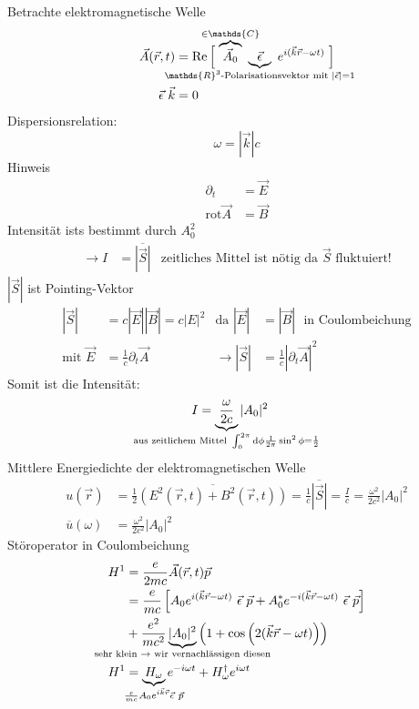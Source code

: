 	Betrachte elektromagnetische Welle
		\begin{align*}
			\vec{A}(\vec{r} , t) &= 
			\mathrm{Re} \left[ \vphantom{ \vec{A}_0 \vec{\epsilon} ~ e^{i(\vec{k} \vec{r} - \omega t)}} \right.
			\overbrace{\vec{A}_0}^{\mathclap{\in \mathds{C}}}
			~ \underbrace{\vec{\epsilon}}_{\mathclap{\mathds{R}^3 \text{-Polarisationsvektor mit~} |\vec{\epsilon}| = 1}}
			~ e^{i(\vec{k} \vec{r} - \omega t)}
			\left. \vphantom{ \vec{A}_0 \vec{\epsilon} ~ e^{i(\vec{k} \vec{r} - \omega t)}} \right] \\
			\vec{\epsilon} ~\vec{k} &= 0
		\end{align*}
	Dispersionsrelation: 
		\begin{equation*}
			\omega = |\vec{k}| c
		\end{equation*}
	Hinweis 
		\begin{align*}
			\partial_{t} &= \vec{E} \\
			\mathrm{rot} \vec{A} &= \vec{B}
		\end{align*}
	Intensität ists bestimmt durch $A_0^2$
		\begin{align*}
			\rightarrow I &= \overline{|\vec{S}|} & \text{zeitliches Mittel ist nötig da $\vec{S}$ fluktuiert!}
		\end{align*}
	$| \vec{S} |$ ist Pointing-Vektor 
		\begin{align*}
			| \vec{S} | &= c |\vec{E}| |\vec{B}| = c |E|^2 &\text{da~} |\vec{E}| &= |\vec{B}| \text{~ in Coulombeichung} \\
			\text{mit~} \vec{E} &= \frac{1}{c} \partial_t \vec{A} 
			&\rightarrow |\vec{S}| &= \frac{1}{c} \left|\partial_t \vec{A}\right|^2
		\end{align*}
	Somit ist die Intensität:
		\begin{align*}
			I &= \underbrace{\frac{\omega}{2 c}}_{\mathclap{\text{aus zeitlichem Mittel~} \int_{0}^{2 \pi} \diff \phi \frac{1}{2 \pi} \sin^2 \phi = \frac{1}{2}}}
			|A_0|^2
		\end{align*}
	Mittlere Energiedichte der elektromagnetischen Welle
		\begin{align*}
			u (\vec{r}) &=
			\frac{1}{2} \overline{\left( E^2(\vec{r} , t) + B^2(\vec{r} , t) \right)} 
			= \frac{1}{c} \overline{|\vec{S}|} = 
			\frac{I}{c} = \frac{\omega^2}{2 c^2} |A_0|^2 \\
			\overline{u} (\omega) &= \frac{\omega^2}{2 c^2} |A_0|^2
		\end{align*}
	Störoperator in Coulombeichung
		\begin{align*}
			H^1 &= \frac{e}{2 m c} \vec{A} (\vec{r} , t) \vec{p} \\
			&= \frac{e}{m c}
			\left[A_0 e^{i(\vec{k} \vec{r} - \omega t)} ~\vec{\epsilon}~\vec{p}
			+ A^*_0 e^{-i(\vec{k} \vec{r} - \omega t)} ~\vec{\epsilon}~\vec{p}
			\right] \\
			&+ \frac{e^2}{m c^2} \underbrace{|A_0|^2}_{\mathclap{\text{sehr klein~} \rightarrow \text{~wir vernachlässigen diesen}}} 
			\left(1 + \cos \left(2 (\vec{k} \vec{r} - \omega t)\right)\right) \\
			H^1 &= \underbrace{H_\omega}_{\mathclap{\frac{e}{m c} A_0 e^{i \vec{k} \vec{r}} \vec{\epsilon}~\vec{p}}} 
			e^{-i \omega t} 
			+ H_\omega^\dagger e^{i \omega t}
		\end{align*}
